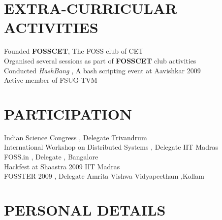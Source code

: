 \documentclass[line,margin]{res}
\begin{document}
\begin{resume}
\section{EXTRA-CURRICULAR \\ ACTIVITIES}             
    Founded {\bf FOSSCET}, The FOSS club of CET \\
    Organised several sessions as part of {\bf FOSSCET} club activities\\
    Conducted {\sl HashBang }, A bash scripting event at Aavishkar 2009\\
    Active member of FSUG-TVM \\
    
\section{PARTICIPATION}
    Indian Science Congress , Delegate  \hfill Trivandrum \\
    International Workshop on Distributed Systems , Delegate \hfill IIT Madras \\
    FOSS.in , Delegate , \hfill Bangalore     \\
    Hackfest at Shaastra 2009 \hfill IIT Madras \\
    FOSSTER 2009 , Delegate \hfill Amrita Vishwa Vidyapeetham ,Kollam \\
			
			
\section{PERSONAL DETAILS} 


\end{resume}
\end{document}
